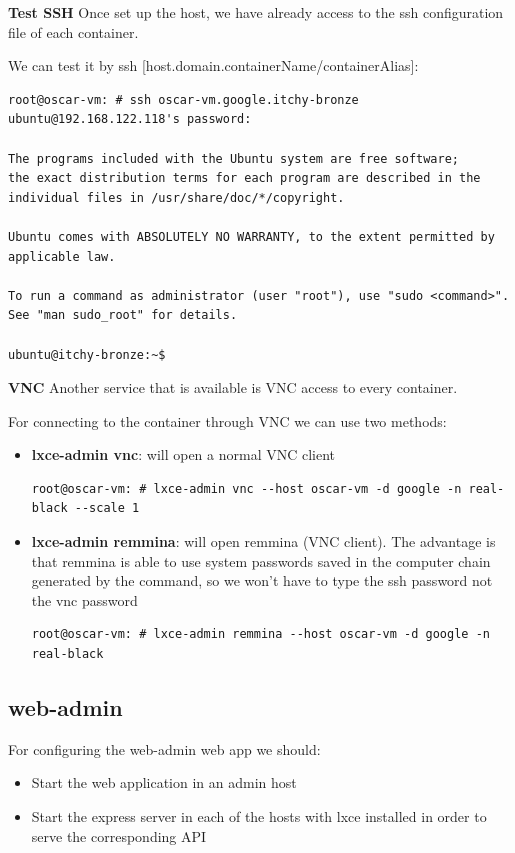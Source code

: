 \newpage
\textbf{Test SSH}
Once set up the host, we have already access to the ssh configuration file of each container.

We can test it by ssh [host.domain.containerName/containerAlias]:
\begin{verbatim}
root@oscar-vm: # ssh oscar-vm.google.itchy-bronze
ubuntu@192.168.122.118's password:

The programs included with the Ubuntu system are free software;
the exact distribution terms for each program are described in the
individual files in /usr/share/doc/*/copyright.

Ubuntu comes with ABSOLUTELY NO WARRANTY, to the extent permitted by
applicable law.

To run a command as administrator (user "root"), use "sudo <command>".
See "man sudo_root" for details.

ubuntu@itchy-bronze:~$
\end{verbatim}

\textbf{VNC}
Another service that is available is VNC access to every container.

For connecting to the container through VNC we can use two methods:
\begin{itemize}
	\item{\textbf{lxce-admin vnc}: will open a normal VNC client}
\begin{verbatim}
root@oscar-vm: # lxce-admin vnc --host oscar-vm -d google -n real-black --scale 1
\end{verbatim}
	\item{\textbf{lxce-admin remmina}: will open remmina (VNC client). The advantage is that remmina is able to use system passwords saved in the computer chain generated by the command, so we won't have to type the ssh password not the vnc password}
\begin{verbatim}
root@oscar-vm: # lxce-admin remmina --host oscar-vm -d google -n real-black
\end{verbatim}
\end{itemize}


\subsection{web-admin}
For configuring the web-admin web app we should:
\begin{itemize}
	\item{Start the web application in an admin host}
	\item{Start the express server in each of the hosts with lxce installed in order to serve the corresponding API}
\end{itemize}

